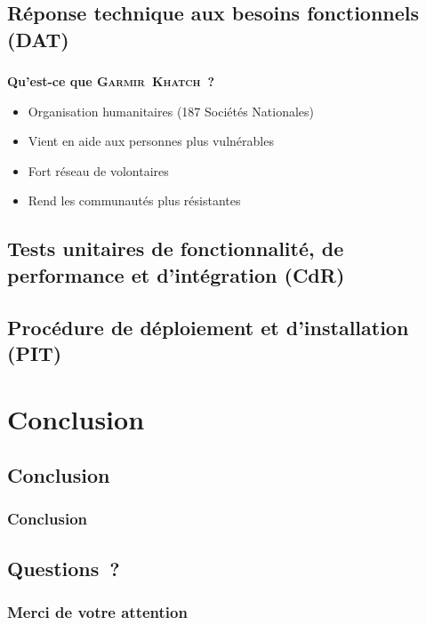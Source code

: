 \documentclass[10pt,fleqn]{beamer}
\newcommand{\mo}{\textsc{Garmir~Khatch}}
\begin{document}
\subsection[Réponse technique aux besoins fonctionnels (DAT)]{Réponse technique aux besoins fonctionnels (DAT)}
\begin{frame}
\frametitle{}
\begin{block}{\textbf{Qu'est-ce que \mo~?}}
\begin{itemize}
\item Organisation humanitaires (187 Sociétés Nationales)
\item Vient en aide aux personnes plus vulnérables
\item Fort réseau de volontaires
\item Rend les communautés plus résistantes
\end{itemize}
\end{block}
\end{frame}

\subsection[Tests unitaires de fonctionnalité, de performance et d'intégration (CdR)]{Tests unitaires de fonctionnalité, de performance et d'intégration (CdR)}
\begin{frame}
\end{frame}

\subsection[Procédure de déploiement et d'installation (PIT)]{Procédure de déploiement et d'installation (PIT)}
\begin{frame}
\end{frame}

\section[Conclusion]{Conclusion}

\subsection[Conclusion]{Conclusion}
\begin{frame}
	\frametitle{Conclusion}
\end{frame}

\subsection[Questions~?]{Questions~?}
\begin{frame}
	\frametitle{Merci de votre attention}
\end{frame}
\end{document}
